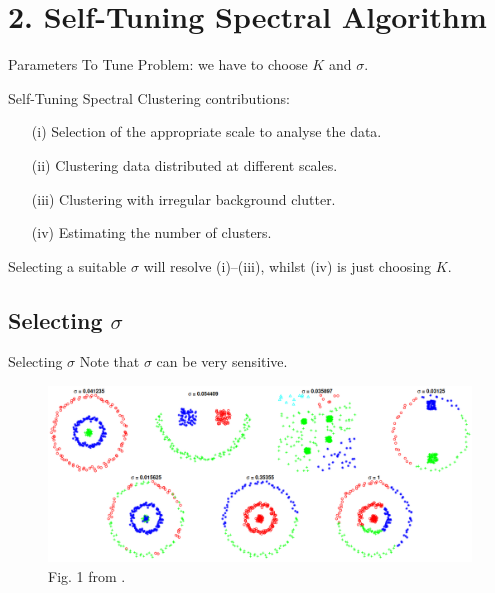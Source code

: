 \documentclass[aspectratio=169]{beamer}
\begin{document}
\section{2. Self-Tuning Spectral Algorithm}
\begin{frame}{Parameters To Tune}
    \alert{Problem:} we have to choose $K$ and $\sigma$.
    \newline
    \pause

    \alert{Self-Tuning Spectral Clustering} \cite{zelnik-manor_self-tuning_2004} contributions:
    \begin{itemize}
      \item[(i)] Selection of the appropriate scale to analyse the data.
      \item[(ii)] Clustering data distributed at different scales.
      \item[(iii)] Clustering with irregular background clutter.
      \item[(iv)] Estimating the number of clusters.
    \end{itemize}
    \pause
    Selecting a suitable $\sigma$ will resolve (i)--(iii), whilst (iv) is just choosing $K$.
\end{frame}

\subsection{Selecting $\sigma$}
\begin{frame}{Selecting $\sigma$}
    Note that $\sigma$ can be \alert{very} sensitive.
    \begin{figure}
      \centering
      \includegraphics[scale=0.3]{sensitive_sigma.png}
      \caption{Fig. 1 from \cite{zelnik-manor_self-tuning_2004}.}
    \end{figure}
\end{frame}
\end{document}
